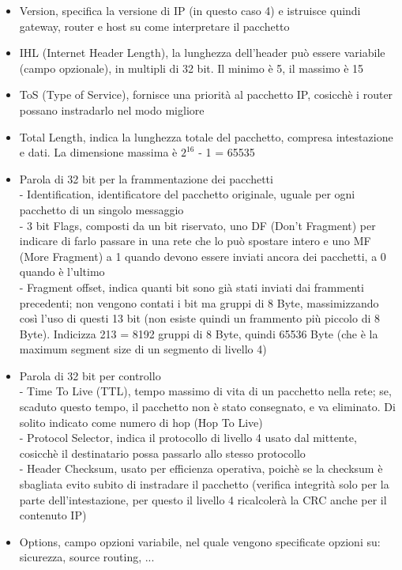 \documentclass[11pt, oneside]{article}   	%
\begin{document}
\begin{itemize}
\item Version, specifica la versione di IP (in questo caso 4) e istruisce quindi gateway,
router e host su come interpretare il pacchetto
\item IHL (Internet Header Length), la lunghezza dell'header può essere variabile (campo opzionale), in multipli di 32 bit. Il minimo è 5, il massimo è 15
\item ToS (Type of Service), fornisce una priorità al pacchetto IP, cosicchè i router possano instradarlo nel modo migliore
\item Total Length, indica la lunghezza totale del pacchetto, compresa intestazione e dati. La dimensione massima è $2^{16}$ - 1 = 65535
\item Parola di 32 bit per la frammentazione dei pacchetti\\
- Identification, identificatore del pacchetto originale, uguale per ogni pacchetto di un singolo messaggio\\
- 3 bit Flags, composti da un bit riservato, uno DF (Don't Fragment) per indicare di farlo passare in una rete che lo può spostare intero e uno MF (More Fragment) a 1 quando devono essere inviati ancora dei pacchetti, a 0 quando è l'ultimo\\
- Fragment offset, indica quanti bit sono già stati inviati dai frammenti precedenti; non vengono contati i bit ma gruppi di 8 Byte, massimizzando così l'uso di questi 13 bit (non esiste quindi un frammento più piccolo di 8 Byte). Indicizza 213 = 8192 gruppi di 8 Byte, quindi 65536 Byte (che è la maximum segment size di un segmento di livello 4)\\
\item Parola di 32 bit per controllo\\
- Time To Live (TTL), tempo massimo di vita di un pacchetto nella rete; se, scaduto questo tempo, il pacchetto non è stato consegnato, e va eliminato. Di solito indicato come numero di hop (Hop To Live)\\
- Protocol Selector, indica il protocollo di livello 4 usato dal mittente, cosicchè il destinatario possa passarlo allo stesso protocollo\\
- Header Checksum, usato per efficienza operativa, poichè se la checksum è sbagliata evito subito di instradare il pacchetto (verifica integrità solo per la parte dell'intestazione, per questo il livello 4 ricalcolerà la CRC anche per il contenuto IP)
\item Options, campo opzioni variabile, nel quale vengono specificate opzioni su: sicurezza, source routing, ...
\end{itemize}
\end{document}
